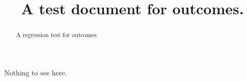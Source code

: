 \documentclass{ximera}
\title{A test document for outcomes.}
\begin{document}
\begin{abstract}
  A regression test for outcomes.
\end{abstract}
\maketitle

Nothing to see here.
\end{document}
